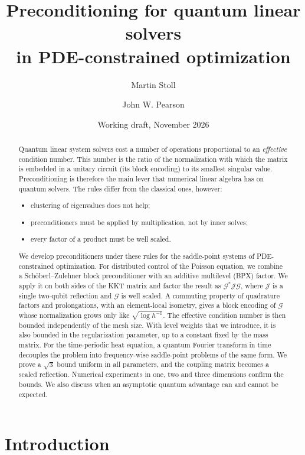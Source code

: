 \documentclass[11pt,a4paper]{article}
\title{Preconditioning for quantum linear solvers\\ in PDE-constrained optimization}
\author{Martin Stoll \and John W. Pearson}
\date{Working draft, November 2026}
\newcommand{\G}{\mathcal{G}}
\newcommand{\J}{\mathcal{J}}
\theoremstyle{remark}
\begin{document}
\maketitle

\begin{abstract}
Quantum linear system solvers cost a number of operations proportional to an
\emph{effective} condition number. This number is the ratio of the
normalization with which the matrix is embedded in a unitary circuit (its
block encoding) to its smallest singular value. Preconditioning is
therefore the main lever that numerical linear algebra has on quantum
solvers. The rules differ from the classical ones, however:
\begin{itemize}
\item clustering of eigenvalues does not help;
\item preconditioners must be applied by multiplication, not by inner
  solves;
\item every factor of a product must be well scaled.
\end{itemize}
We develop preconditioners under these rules for the saddle-point systems
of PDE-constrained optimization. For distributed control of the Poisson
equation, we combine a Sch\"oberl--Zulehner block preconditioner with an
additive multilevel (BPX) factor. We apply it on both sides of the KKT
matrix and factor the result as $\G^*\J\G$, where $\J$ is a single
two-qubit reflection and $\G$ is well scaled. A commuting property of
quadrature factors and prolongations, with an element-local isometry,
gives a block encoding of $\G$ whose normalization grows only like
$\sqrt{\log h^{-1}}$. The effective condition number is then bounded
independently of the mesh size. With level weights that we introduce, it
is also bounded in the regularization parameter, up to a constant fixed by
the mass matrix. For the time-periodic heat equation, a quantum Fourier
transform in time decouples the problem into frequency-wise saddle-point
problems of the same form. We prove a $\sqrt3$ bound uniform in all
parameters, and the coupling matrix becomes a scaled reflection.
Numerical experiments in one, two and three dimensions confirm the
bounds. We also discuss when an asymptotic quantum advantage can and
cannot be expected.
\end{abstract}

\section{Introduction}\label{sec:intro}
\end{document}

